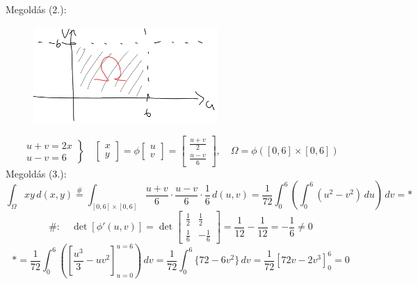 \documentclass[a4paper,11.5pt]{article}
\begin{document}
\begin{task}
		Megoldás (2.): 
		\begin{figure}[h]
			\centering
			\includegraphics[width=7cm]{kepek/02.png}
			\caption{}
		\end{figure}
		\[ \left.\begin{gathered}
		u+v=2x\\
		u-v=6
		\end{gathered}\right\}\quad \begin{bmatrix}
		x\\y
		\end{bmatrix}=\phi \begin{bmatrix}
		u\\v
		\end{bmatrix}=\begin{bmatrix}
		\frac{u+v}{2}\\\frac{u-v}{6}
		\end{bmatrix},\quad \varOmega=\phi\left([0,6]\times[0,6]\right) \]
		Megoldás (3.):
		\[ \int_{\varOmega}^{}xy\,d(x,y)\overset{\#}{=}\int_{[0,6]\times[0,6]}^{}\frac{u+v}{6}\cdot\frac{u-v}{6}\cdot\frac{1}{6}\,d(u,v)=\frac{1}{72}\int_{0}^{6}\left(\int_0^6(u^2-v^2)\,du\right)\,dv=* \]
		\[ \#: \quad \det[\phi'(u,v)]=\det \begin{bmatrix}
			\frac{1}{2}&\frac{1}{2}\\
			\frac{1}{6}&-\frac{1}{6}
		\end{bmatrix}= \frac{1}{12}-\frac{1}{12}=-\frac{1}{6}\not=0\]
		\[ *=\frac{1}{72}\int_{0}^{6}\left( \left[\frac{u^3}{3}-uv^2\right]_{u=0}^{u=6} \right)\,dv=\frac{1}{72}\int_0^6\{72-6v^2 \}\,dv=\frac{1}{72}[72v-2v^3]_0^6=0  \]  
	\end{task}
\end{document}
